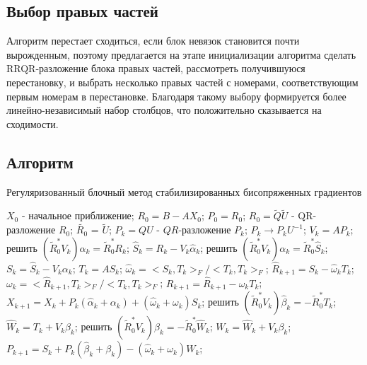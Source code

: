 \subsection{Выбор правых частей}
Алгоритм перестает сходиться, если блок невязок становится почти вырожденным, поэтому предлагается
на этапе инициализации алгоритма сделать RRQR-разложение блока правых частей, рассмотреть получившуюся
перестановку, и выбрать несколько правых частей с номерами, соответствующим первым номерам в перестановке.
Благодаря такому выбору формируется более линейно-независимый набор столбцов, что положительно сказывается
на сходимости.    
\subsection{Алгоритм}
\begin{algorithm}[H]
    \caption{Регуляризованный блочный метод стабилизированных бисопряженных градиентов}\label{alg:bbcsgr}
    \begin{algorithmic}
        \State $X_0$ - начальное приближение;
        \State $R_0 = B - AX_0$;
        \State $P_0 = R_0$;
        \State $R_0 = \tilde{Q}\tilde{U}$ - QR-разложение $R_0$;
        \State $\tilde{R_0}$ = $\tilde{U}$;
            \State $P_k = QU$ - $QR$-разложение $P_k$;
            \State $P_k \rightarrow P_kU^{-1}$;
            \State $V_k = AP_k$;
            \State решить $(\tilde{R}_0^*V_k)\hat{\alpha}_k=\tilde{R}_0^*R_k$;
            \State $\hat{S}_k = R_k - V_k\hat{\alpha}_k$;
            \State решить $(\tilde{R}_0^*V_k)\alpha_k=\tilde{R}_0^*\hat{S}_k$;
            \State $S_k = \hat{S}_k - V_k \alpha_k$;
            \State $T_k = A S_k$;
            \State $\hat{\omega}_k = <S_k,T_k>_F / <T_k,T_k>_F$;
            \State $\hat{R}_{k+1} = S_k - \hat{\omega}_kT_k$;
            \State $\omega_k = <\hat{R}_{k+1}, T_k>_F / <T_k, T_k>_F$;
            \State $R_{k+1} = \hat{R}_{k+1} - \omega_kT_k$;
            \State $X_{k+1} = X_k + P_k(\hat{\alpha}_k + \alpha_k) + (\hat{\omega}_k + \omega_k)S_k$;
            \State решить $(\tilde{R}_0^*V_k)\hat{\beta}_k=-\tilde{R}_0^*T_k$;
            \State $\hat{W}_k = T_k + V_k \hat{\beta}_k$;
            \State решить $(\tilde{R}_0^*V_k)\beta_k=-\tilde{R}_0^*\hat{W}_k$;
            \State $W_k = \hat{W}_k + V_k \beta_k$;
            \State $P_{k+1} = S_k + P_k(\hat{\beta}_k + \beta_k) - (\hat{\omega}_k + \omega_k)W_k$;
        \EndFor
    \end{algorithmic}
\end{algorithm}
